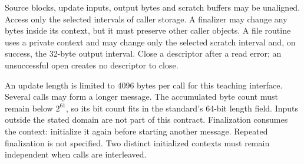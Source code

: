 Source blocks, update inputs, output bytes and scratch buffers may be unaligned.
Access only the selected intervals of caller storage. A finalizer may change any bytes
inside its context, but it must preserve other caller objects. A file routine uses a
private context and may change only the selected scratch interval and, on success,
the 32-byte output interval. Close a descriptor after a read error; an unsuccessful
open creates no descriptor to close.

An update length is limited to 4096 bytes per call for this teaching interface. Several
calls may form a longer message. The accumulated byte count must remain below
\(2^{61}\), so its bit count fits in the standard's 64-bit length field. Inputs outside
the stated domain are not part of this contract. Finalization consumes the context:
initialize it again before starting another message. Repeated finalization is not
specified. Two distinct initialized contexts must remain independent when calls are
interleaved.
